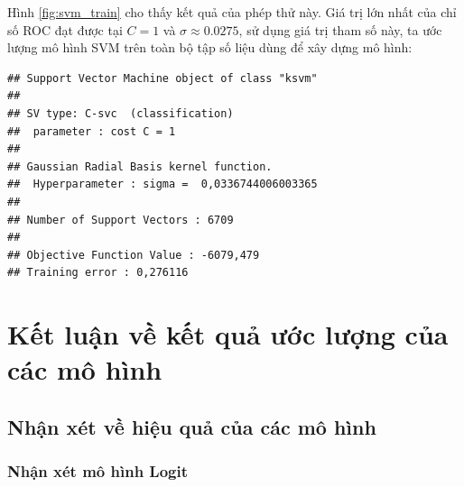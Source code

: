 \documentclass[a4paper]{report}\usepackage[]{graphicx}\usepackage[]{color}
\makeatletter
\newenvironment{kframe}{%
 \def\at@end@of@kframe{}%
 \ifinner\ifhmode%
  \def\at@end@of@kframe{\end{minipage}}%
  \begin{minipage}{\columnwidth}%
 \fi\fi%
 \def\FrameCommand##1{\hskip\@totalleftmargin \hskip-\fboxsep
 \colorbox{shadecolor}{##1}\hskip-\fboxsep
     \hskip-\linewidth \hskip-\@totalleftmargin \hskip\columnwidth}%
 \MakeFramed {\advance\hsize-\width
   \@totalleftmargin\z@ \linewidth\hsize
   \@setminipage}}%
 {\par\unskip\endMakeFramed%
 \at@end@of@kframe}
\newenvironment{knitrout}{}{} %
\makeatother
\begin{document}
Hình \ref{fig:svm_train} cho thấy kết quả của phép thử này.  Giá trị lớn nhất của chỉ số ROC đạt được tại $C = 1$ và $\sigma \approx 0.0275$, sử dụng giá trị tham số này, ta ước lượng mô hình SVM trên toàn bộ tập số liệu dùng để xây dựng mô hình:

\begin{knitrout}\small
{}\color{fgcolor}\begin{kframe}
\begin{verbatim}
## Support Vector Machine object of class "ksvm" 
## 
## SV type: C-svc  (classification) 
##  parameter : cost C = 1 
## 
## Gaussian Radial Basis kernel function. 
##  Hyperparameter : sigma =  0,0336744006003365 
## 
## Number of Support Vectors : 6709 
## 
## Objective Function Value : -6079,479 
## Training error : 0,276116
\end{verbatim}
\end{kframe}
\end{knitrout}



\section{Kết luận về kết quả ước lượng của các mô hình}

\subsection{Nhận xét về hiệu quả của các mô hình}

\subsubsection{Nhận xét mô hình Logit}



\end{document}
